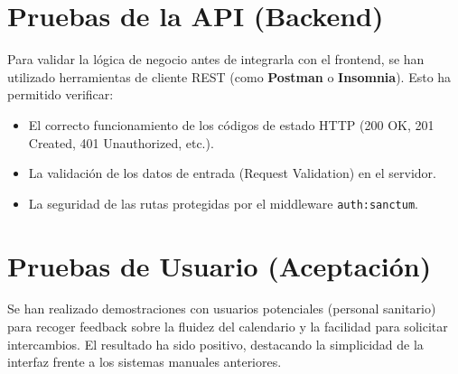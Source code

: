 \section{Pruebas de la API (Backend)}
Para validar la lógica de negocio antes de integrarla con el frontend, se han utilizado herramientas de cliente REST (como \textbf{Postman} o \textbf{Insomnia}). Esto ha permitido verificar:
\begin{itemize}
    \item El correcto funcionamiento de los códigos de estado HTTP (200 OK, 201 Created, 401 Unauthorized, etc.).
    \item La validación de los datos de entrada (Request Validation) en el servidor.
    \item La seguridad de las rutas protegidas por el middleware \texttt{auth:sanctum}.
\end{itemize}

\section{Pruebas de Usuario (Aceptación)}
Se han realizado demostraciones con usuarios potenciales (personal sanitario) para recoger feedback sobre la fluidez del calendario y la facilidad para solicitar intercambios. El resultado ha sido positivo, destacando la simplicidad de la interfaz frente a los sistemas manuales anteriores.
